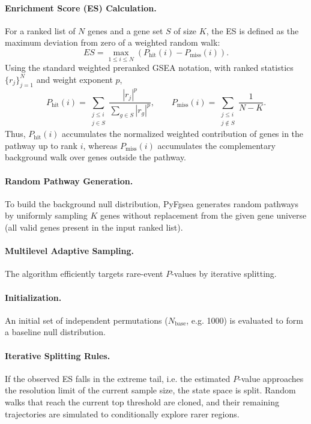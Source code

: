 \documentclass[11pt]{article}
\begin{document}
\paragraph{Enrichment Score (ES) Calculation.}
For a ranked list of $N$ genes and a gene set $S$ of size $K$, the ES is defined as the maximum deviation from zero of a weighted random walk:
\[
ES = \max_{1 \le i \le N} \left( P_{\mathrm{hit}}(i) - P_{\mathrm{miss}}(i) \right).
\]
Using the standard weighted preranked GSEA notation, with ranked statistics $\{r_j\}_{j=1}^{N}$ and weight exponent $p$,
\[
P_{\mathrm{hit}}(i)=\sum_{\substack{j \le i \\ j \in S}} \frac{|r_j|^{p}}{\sum_{g \in S} |r_g|^{p}},
\qquad
P_{\mathrm{miss}}(i)=\sum_{\substack{j \le i \\ j \notin S}} \frac{1}{N-K}.
\]
Thus, $P_{\mathrm{hit}}(i)$ accumulates the normalized weighted contribution of genes in the pathway up to rank $i$, whereas $P_{\mathrm{miss}}(i)$ accumulates the complementary background walk over genes outside the pathway.

\paragraph{Random Pathway Generation.}
To build the background null distribution, PyFgsea generates random pathways by uniformly sampling $K$ genes without replacement from the given gene universe (all valid genes present in the input ranked list).

\paragraph{Multilevel Adaptive Sampling.}
The algorithm efficiently targets rare-event $P$-values by iterative splitting.

\paragraph{Initialization.}
An initial set of independent permutations ($N_{\mathrm{base}}$, e.g. 1000) is evaluated to form a baseline null distribution.

\paragraph{Iterative Splitting Rules.}
If the observed ES falls in the extreme tail, i.e. the estimated $P$-value approaches the resolution limit of the current sample size, the state space is split. Random walks that reach the current top threshold are cloned, and their remaining trajectories are simulated to conditionally explore rarer regions.
\end{document}
